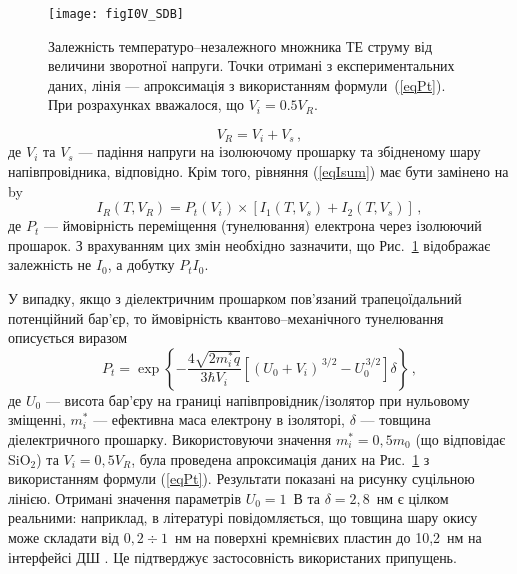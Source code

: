 \begin{figure}
\center
\texttt{[image: figI0V\_SDB]}
\caption{\label{figI0V_SDB}
Залежність температуро--незалежного множника ТЕ струму від величини зворотної напруги.
Точки отримані з експериментальних даних,
лінія --- апроксимація з використанням формули~(\ref{eqPt}).
При розрахунках вважалося, що $V_i=0.5V_R$.
}%
\end{figure}


\begin{equation}\label{eqVR}
    V_R=V_i+V_s\,,
\end{equation}
де
$V_i$ та $V_s$ --- падіння напруги на ізолюючому прошарку та збідненому шару напівпровідника, відповідно.
Крім того, рівняння (\ref{eqIsum}) має бути замінено на
 by
\begin{equation}\label{eqIsum2}
    I_R(T,V_R)=P_t(V_i)\times[I_1(T,V_s)+I_2(T,V_s)]\,,
\end{equation}
де
$P_t$ --- ймовірність переміщення (тунелювання) електрона через ізолюючий прошарок.
З врахуванням цих змін необхідно зазначити, що Рис.~\ref{figI0V_SDB} відображає залежність не $I_0$,
а добутку $P_tI_0$.

У випадку, якщо з діелектричним прошарком пов'язаний трапецоїдальний потенційний бар'єр,
то ймовірність квантово--механічного тунелювання описується виразом
\begin{equation}\label{eqPt}
    P_t=\exp\left\{-\frac{4\sqrt{2m_i^*q}}{3\hbar V_i}\left[(U_0+V_i)^{\,3/2}-U_0^{\,3/2}\right]\delta\right\}\,,
\end{equation}
де
$U_0$ --- висота бар'єру на границі напівпровідник/ізолятор при нульовому зміщенні,
$m_i^*$ --- ефективна маса електрону в ізоляторі,
$\delta$ --- товщина діелектричного прошарку.
Використовуючи значення $m_i^*=0,5m_0$ (що відповідає SiO$_2$)
та $V_i=0,5V_R$, була проведена апроксимація даних на Рис.~\ref{figI0V_SDB} з використанням формули
(\ref{eqPt}).
Результати показані на рисунку суцільною лінією.
Отримані значення параметрів $U_0=1$~В та $\delta=2,8$~нм є цілком реальними: наприклад,
в літературі повідомляється, що товщина шару окису може складати від $0,2\div1$~нм на поверхні кремнієвих пластин \cite{Saito}
до 10,2~нм на інтерфейсі ДШ \cite{SHIWAKOTI2018}.
Це підтверджує застосовність використаних припущень.

